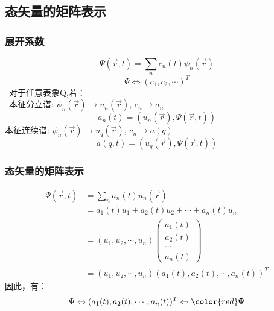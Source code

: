 \subsection{态矢量的矩阵表示}

\begin{frame} 
    \frametitle{展开系数}   
        $$ \Psi(\vec{r},t)=\sum_n c_n(t) \psi_n(\vec{r})$$ 
        $$ \Psi\Leftrightarrow(c_1,c_2,\cdots)^T $$   
    \证 ~对于任意表象Q,若：\\
     本征分立谱: $\psi_n(\vec{r}) \to u_n(\vec{r})$, $c_n \to a_n $
        \begin{equation*}
            a_n(t)=(u_n(\vec{r}), \Psi(\vec{r},t)) 
        \end{equation*}  
    本征连续谱: $\psi_n(\vec{r}) \to u_q(\vec{r})$, $c_n \to a(q) $
        \begin{equation*}
            a(q,t)=(u_q(\vec{r}), \Psi(\vec{r},t)) 
        \end{equation*}  
\end{frame} 

\begin{frame} 
        \frametitle{态矢量的矩阵表示} 
        \begin{equation*}
            \begin{split} 
                \Psi(\vec{r},t)&=\sum_n a_n(t) u_n(\vec{r}) \\
                &=a_1(t) u_1+ a_2(t) u_2+\cdots+ a_n(t) u_n \\
                &=(u_1,u_2,\cdots,u_n) 
               \begin{pmatrix}
                    a_1(t)\\
                    a_2(t)\\
                    \cdots\\
                    a_n(t)
                \end{pmatrix} \\
                &= (u_1,u_2,\cdots,u_n) (a_1(t),a_2(t),\cdots, a_n(t))^T
            \end{split}  
        \end{equation*}  
        因此，有： $$   \Psi \Leftrightarrow (a_1(t),a_2(t),\cdots, a_n(t))^T \Leftrightarrow {\color{red}  \pmb {\Psi} } $$
\end{frame}

